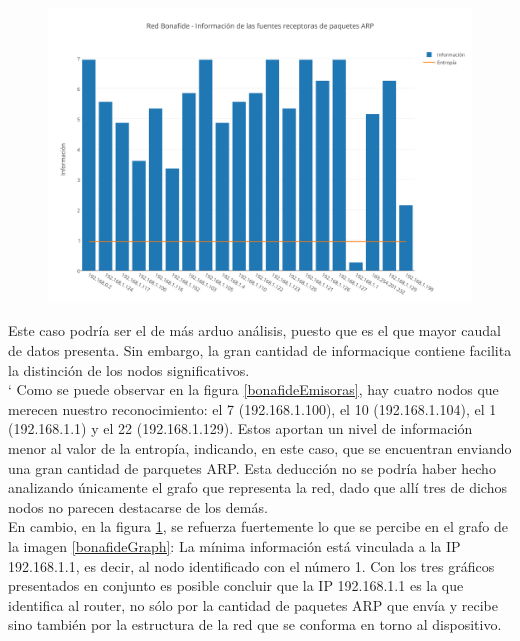\begin{figure}[h!]
    \centering                                                       
    \includegraphics[width=400pt]{img/RedBonafideFuentesReceptorasARP}
    \caption{}
    \label{bonafideReceptoras}
\end{figure}

Este caso podr\'ia ser el de m\'as arduo an\'alisis, puesto que es el que mayor caudal de datos presenta. Sin embargo, la gran cantidad de informaci que contiene facilita la distinci\'on de los nodos significativos. \\`
Como se puede observar en la figura \ref{bonafideEmisoras}, hay cuatro nodos que merecen nuestro reconocimiento: el 7 (192.168.1.100), el 10 (192.168.1.104), el 1 (192.168.1.1) y el 22 (192.168.1.129). Estos aportan un nivel de informaci\'on menor al valor de la entrop\'ia, indicando, en este caso, que se encuentran enviando una gran cantidad de parquetes ARP. Esta deducci\'on no se podr\'ia haber hecho analizando \'unicamente el grafo que representa la red, dado que all\'i tres de dichos nodos no parecen destacarse de los dem\'as.\\

En cambio, en la figura \ref{bonafideReceptoras}, se refuerza fuertemente lo que se percibe en el grafo de la imagen \ref{bonafideGraph}: La mínima informaci\'on est\'a vinculada a la IP 192.168.1.1, es decir, al nodo identificado con el n\'umero 1. Con los tres gr\'aficos presentados en conjunto es posible concluir que la IP 192.168.1.1 es la que identifica al router, no s\'olo por la cantidad de paquetes ARP que env\'ia y recibe sino tambi\'en por la estructura de la red que se conforma en torno al dispositivo.


